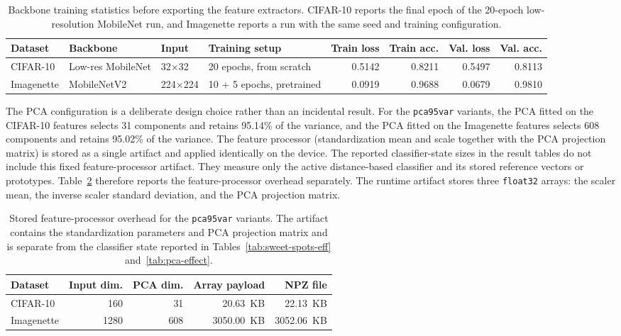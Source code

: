 \documentclass[sigconf,review,nonacm]{acmart}
\begin{document}
\begin{table}[t]
  \caption{Backbone training statistics before exporting the feature extractors. CIFAR-10 reports the final epoch of the 20-epoch low-resolution MobileNet run, and Imagenette reports a run with the same seed and training configuration.}
  \label{tab:backbone-training-stats}
  \centering
  \footnotesize
  \begin{tabular}{@{}llllrrrr@{}}
    \toprule
    Dataset & Backbone & Input & Training setup & Train loss & Train acc. & Val. loss & Val. acc. \\
    \midrule
    CIFAR-10 & Low-res MobileNet & 32$\times$32 & 20 epochs, from scratch & 0.5142 & 0.8211 & 0.5497 & 0.8113 \\
    Imagenette & MobileNetV2 & 224$\times$224 & 10 + 5 epochs, pretrained & 0.0919 & 0.9688 & 0.0679 & 0.9810 \\
    \bottomrule
  \end{tabular}
\end{table}

The PCA configuration is a deliberate design choice rather than an incidental result.
For the \texttt{pca95var} variants, the PCA fitted on the CIFAR-10 features selects 31 components and retains 95.14\% of the variance, and the PCA fitted on the Imagenette features selects 608 components and retains 95.02\% of the variance.
The feature processor (standardization mean and scale together with the PCA projection matrix) is stored as a single artifact and applied identically on the device.
The reported classifier-state sizes in the result tables do not include this fixed feature-processor artifact. They measure only the active distance-based classifier and its stored reference vectors or prototypes.
Table~\ref{tab:feature-processor-overhead} therefore reports the feature-processor overhead separately.
The runtime artifact stores three \texttt{float32} arrays: the scaler mean, the inverse scaler standard deviation, and the PCA projection matrix.

\begin{table}[t]
  \caption{Stored feature-processor overhead for the \texttt{pca95var} variants. The artifact contains the standardization parameters and PCA projection matrix and is separate from the classifier state reported in Tables~\ref{tab:sweet-spots-eff} and~\ref{tab:pca-effect}.}
  \label{tab:feature-processor-overhead}
  \centering
  \footnotesize
  \begin{tabular}{@{}lrrrr@{}}
    \toprule
    Dataset & Input dim. & PCA dim. & Array payload & NPZ file \\
    \midrule
    CIFAR-10 & 160 & 31 & 20.63~KB & 22.13~KB \\
    Imagenette & 1280 & 608 & 3050.00~KB & 3052.06~KB \\
    \bottomrule
  \end{tabular}
\end{table}
\end{document}
